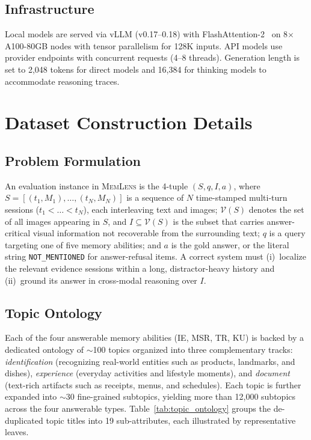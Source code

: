 \documentclass{llmxive}
\providecommand{\bench}{\textsc{MemLens}}
\begin{document}
\subsection{Infrastructure}
\label{subsec:infra}

Local models are served via vLLM (v0.17--0.18) with FlashAttention-2~\cite{dao2023flashattention2} on 8$\times$A100-80GB nodes with tensor parallelism for 128K inputs.
API models use provider endpoints with concurrent requests (4--8 threads).
Generation length is set to 2,048 tokens for direct models and 16,384 for thinking models to accommodate reasoning traces.



\section{Dataset Construction Details}
\label{app:dataset_construction}

\subsection{Problem Formulation}
\label{app:problem_formulation}

An evaluation instance in \bench{} is the 4-tuple $(S, q, I, a)$, where $S = [(t_1, M_1), \dots, (t_N, M_N)]$ is a sequence of $N$ time-stamped multi-turn sessions ($t_1 < \dots < t_N$), each interleaving text and images; $\mathcal{V}(S)$ denotes the set of all images appearing in $S$, and $I \subseteq \mathcal{V}(S)$ is the subset that carries answer-critical visual information not recoverable from the surrounding text; $q$ is a query targeting one of five memory abilities; and $a$ is the gold answer, or the literal string \texttt{NOT\_MENTIONED} for answer-refusal items. A correct system must (i)~localize the relevant evidence sessions within a long, distractor-heavy history and (ii)~ground its answer in cross-modal reasoning over $I$.

\subsection{Topic Ontology}
\label{app:topic_ontology}

Each of the four answerable memory abilities (IE, MSR, TR, KU) is backed by a dedicated ontology of $\sim$100 topics organized into three complementary tracks: \emph{identification} (recognizing real-world entities such as products, landmarks, and dishes), \emph{experience} (everyday activities and lifestyle moments), and \emph{document} (text-rich artifacts such as receipts, menus, and schedules). Each topic is further expanded into $\sim$30 fine-grained subtopics, yielding more than 12{,}000 subtopics across the four answerable types. Table~\ref{tab:topic_ontology} groups the de-duplicated topic titles into 19 sub-attributes, each illustrated by representative leaves.
\end{document}
